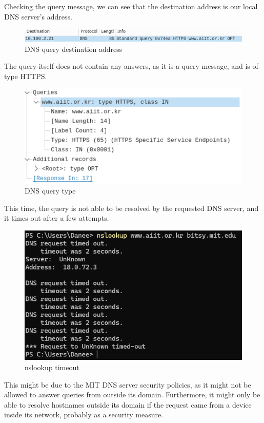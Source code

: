 Checking the query message, we can see that the destination address is our
local DNS server's address.

\begin{figure}[htbp]
    \centering
    \includegraphics[width=1\linewidth]{img/22.png}
    \caption{DNS query destination address}\label{fig:22}
\end{figure}

The query itself does not contain any answers, as it is a query message, and is
of type HTTPS.\@

\begin{figure}[htbp]
    \centering
    \includegraphics[width=1\linewidth]{img/23.png}
    \caption{DNS query type}\label{fig:23}
\end{figure}

This time, the query is not able to be resolved by the requested DNS server,
and it times out after a few attempts.

\begin{figure}[htbp]
    \centering
    \includegraphics[width=1\linewidth]{img/24.png}
    \caption{nslookup timeout}\label{fig:24}
\end{figure}

This might be due to the MIT DNS server security policies, as it might not be
allowed to answer queries from outside its domain. Furthermore, it might only
be able to resolve hostnames outside its domain if the request came from a
device inside its network, probably as a security measure.